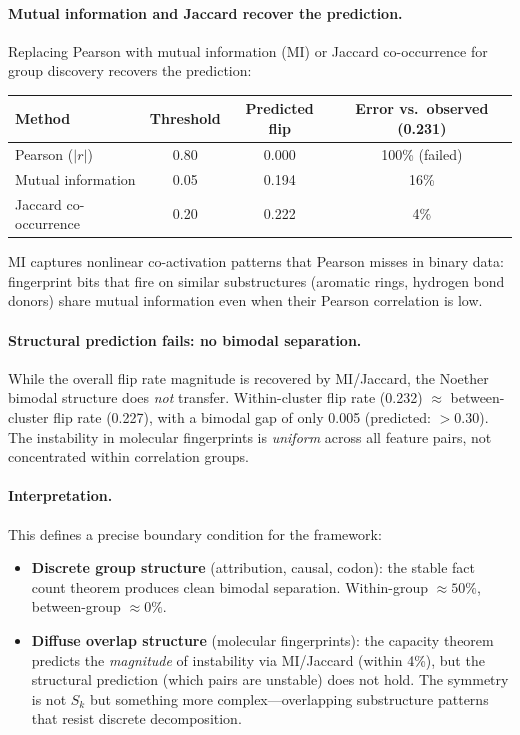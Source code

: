 \documentclass[11pt,a4paper]{article}
\begin{document}
\paragraph{Mutual information and Jaccard recover the prediction.}
Replacing Pearson with mutual information (MI) or Jaccard co-occurrence for group discovery recovers the prediction:

\begin{center}
\small
\begin{tabular}{lccc}
\toprule
Method & Threshold & Predicted flip & Error vs.\ observed (0.231) \\
\midrule
Pearson ($|r|$) & 0.80 & 0.000 & 100\% (failed) \\
Mutual information & 0.05 & 0.194 & 16\% \\
Jaccard co-occurrence & 0.20 & 0.222 & 4\% \\
\bottomrule
\end{tabular}
\end{center}

MI captures nonlinear co-activation patterns that Pearson misses in binary data: fingerprint bits that fire on similar substructures (aromatic rings, hydrogen bond donors) share mutual information even when their Pearson correlation is low.

\paragraph{Structural prediction fails: no bimodal separation.}
While the overall flip rate magnitude is recovered by MI/Jaccard, the Noether bimodal structure does \emph{not} transfer. Within-cluster flip rate (0.232) $\approx$ between-cluster flip rate (0.227), with a bimodal gap of only 0.005 (predicted: $> 0.30$). The instability in molecular fingerprints is \emph{uniform} across all feature pairs, not concentrated within correlation groups.

\paragraph{Interpretation.}
This defines a precise boundary condition for the framework:
\begin{itemize}
  \item \textbf{Discrete group structure} (attribution, causal, codon): the stable fact count theorem produces clean bimodal separation. Within-group $\approx 50\%$, between-group $\approx 0\%$.
  \item \textbf{Diffuse overlap structure} (molecular fingerprints): the capacity theorem predicts the \emph{magnitude} of instability via MI/Jaccard (within 4\%), but the structural prediction (which pairs are unstable) does not hold. The symmetry is not $S_k$ but something more complex---overlapping substructure patterns that resist discrete decomposition.
\end{itemize}
\end{document}
